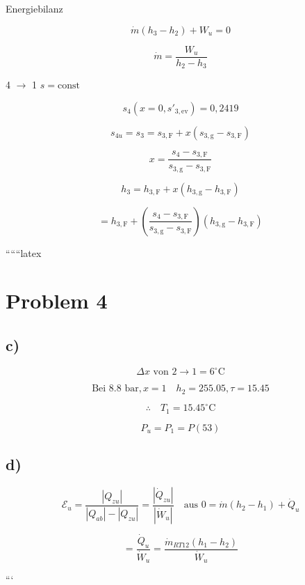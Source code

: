 Energiebilanz

\[
\dot{m} \left( h_3 - h_2 \right) + W_u = 0
\]

\[
\dot{m} = \frac{W_u}{h_2 - h_3}
\]

4 $\rightarrow$ 1 \quad $s = \text{const}$

\[
s_4 (x = 0, s'_{3, \text{ev}}) = 0,2419
\]

\[
s_{4u} = s_3 = s_{3, \text{F}} + x \left( s_{3, \text{g}} - s_{3, \text{F}} \right)
\]

\[
x = \frac{s_4 - s_{3, \text{F}}}{s_{3, \text{g}} - s_{3, \text{F}}}
\]

\[
h_3 = h_{3, \text{F}} + x \left( h_{3, \text{g}} - h_{3, \text{F}} \right)
\]

\[
= h_{3, \text{F}} + \left( \frac{s_4 - s_{3, \text{F}}}{s_{3, \text{g}} - s_{3, \text{F}}} \right) \left( h_{3, \text{g}} - h_{3, \text{F}} \right)
\]

``````latex


\section*{Problem 4}

\subsection*{c)}

\[
\Delta x \text{ von } 2 \rightarrow 1 = 6^\circ \text{C}
\]

\[
\text{Bei } 8.8 \text{ bar}, x = 1 \quad h_2 = 255.05, \tau = 15.45
\]

\[
\therefore \quad T_1 = 15.45^\circ \text{C}
\]

\[
P_u = P_1 = P(53)
\]

\subsection*{d)}

\[
\mathcal{E}_u = \frac{|Q_{zu}|}{|Q_{ab}| - |Q_{zu}|} = \frac{| \dot{Q}_{zu} |}{| \dot{W}_u |} \quad \text{aus } 0 = \dot{m}(h_2 - h_1) + \dot{Q}_u
\]

\[
= \frac{\dot{Q}_u}{\dot{W}_u} = \frac{\dot{m}_{RT12} (h_1 - h_2)}{\dot{W}_u}
\]

```